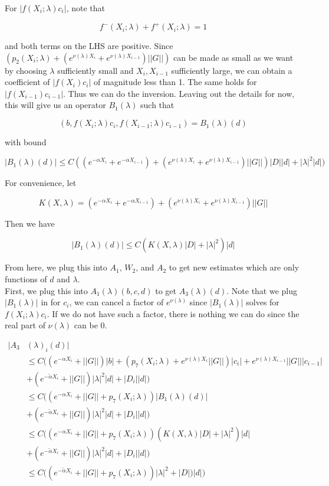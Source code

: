 \documentclass[12pt]{article}
\begin{document}
\begin{enumerate}
For $|f(X_i; \lambda) c_i|$, note that 

\[
f^-(X_i; \lambda) + f^+(X_i; \lambda) = 1
\]

and both terms on the LHS are positive. Since $(p_2(X_i; \lambda) + (e^{\nu(\lambda)X_i} + e^{\nu(\lambda)X_{i-1}})||G||)$ can be made as small as we want by choosing $\lambda$ sufficiently small and $X_i, X_{i-1}$ sufficiently large, we can obtain a coefficient of $|f(X_i)c_i|$ of magnitude less than 1. The same holds for $|f(X_{i-1})c_{i-1}|$. Thus we can do the inversion. Leaving out the details for now, this will give us an operator $B_1(\lambda)$ such that

\[
(b, f(X_i; \lambda) c_i, f(X_{i-1}; \lambda) c_{i-1} ) = B_1(\lambda)(d)
\]

with bound

\[
|B_1(\lambda)(d)| \leq C( (e^{-\alpha X_i} + e^{-\alpha X_{i-1}}) + (e^{\nu(\lambda)X_i} + e^{\nu(\lambda)X_{i-1}}) ||G||) |D||d| + |\lambda|^2 |d|)
\]

For convenience, let

\[
K(X, \lambda) = (e^{-\alpha X_i} + e^{-\alpha X_{i-1}}) + (e^{\nu(\lambda)X_i} + e^{\nu(\lambda)X_{i-1}})||G||
\]

Then we have

\[
|B_1(\lambda)(d)| \leq C( K(X, \lambda) |D|+ |\lambda|^2 )|d|
\]


From here, we plug this into $A_1$, $W_2$, and $A_2$ to get new estimates which are only functions of $d$ and $\lambda$.\\

First, we plug this into $A_1(\lambda)(b, c, d)$ to get $A_3(\lambda)(d)$. Note that we plug $|B_1(\lambda)|$ in for $c_i$, we can cancel a factor of $e^{\nu(\lambda)}$ since $|B_1(\lambda)|$ solves for $f(X_i; \lambda) c_i$. If we do not have such a factor, there is nothing we can do since the real part of $\nu(\lambda)$ can be 0.

\begin{align*}
|A_3&(\lambda)_i(d)| \\
&\leq C \Big( (e^{-\alpha X_i} + ||G||) |b|
+ ( p_7(X_i; \lambda) + e^{\nu(\lambda)X_i} ||G||) |c_i| + e^{\nu(\lambda)X_{i-1}} ||G|| |c_{i-1}| \\
&+ (e^{-\tilde{\alpha} X_i} + ||G||) |\lambda|^2 |d| + |D_i||d| \Big) \\
&\leq C \Big( (e^{-\alpha X_i} + ||G|| + p_7(X_i; \lambda) )|B_1(\lambda)(d)|\\
&+ (e^{-\tilde{\alpha} X_i} + ||G||) |\lambda|^2 |d| + |D_i||d| \Big) \\
&\leq C \Big( (e^{-\alpha X_i} + ||G|| + p_7(X_i; \lambda) )( K(X, \lambda) |D|+ |\lambda|^2 )|d|\\
&+ (e^{-\tilde{\alpha} X_i} + ||G||) |\lambda|^2 |d| + |D_i||d| \Big) \\
&\leq C \Big( (e^{-\tilde{\alpha} X_i} + ||G|| + p_7(X_i; \lambda) ) |\lambda|^2  + |D|)|d| \Big) \\
\end{align*}


\end{enumerate}
\end{document}
